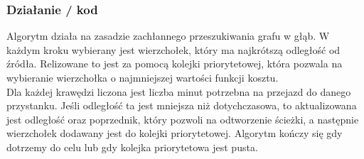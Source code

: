 \documentclass[a4paper, 12pt]{article}
\begin{document}
  \subsubsection{Działanie / kod} Algorytm działa na zasadzie zachłannego przeszukiwania grafu w głąb.
  W każdym kroku wybierany jest wierzchołek, który ma najkrótszą odległość od źródła.
  Relizowane to jest za pomocą kolejki priorytetowej,
  która pozwala na wybieranie wierzchołka o najmniejszej wartości funkcji kosztu.  \\
  Dla każdej krawędzi liczona jest liczba minut potrzebna na przejazd do danego przystanku.
  Jeśli odległość ta jest mniejsza niż dotychczasowa, to aktualizowana jest odległość oraz poprzednik,
  który pozwoli na odtworzenie ścieżki, a następnie wierzchołek dodawany jest do kolejki priorytetowej.
  Algorytm kończy się gdy dotrzemy do celu lub gdy kolejka priorytetowa jest pusta. \\
\end{document}
